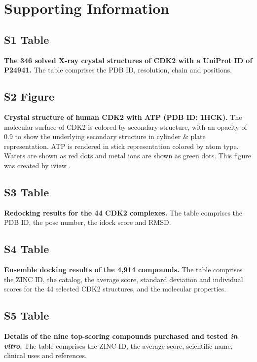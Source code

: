 \documentclass[10pt,letterpaper]{article}
\begin{document}
\section*{Supporting Information}


\subsection*{S1 Table}
\label{S1_Table}
{\bf The 346 solved X-ray crystal structures of CDK2 with a UniProt ID of P24941.} The table comprises the PDB ID, resolution, chain and positions.%

\subsection*{S2 Figure}
\label{S2_Figure}
{\bf Crystal structure of human CDK2 with ATP (PDB ID: 1HCK).} The molecular surface of CDK2 is colored by secondary structure, with an opacity of 0.9 to show the underlying secondary structure in cylinder \& plate representation. ATP is rendered in stick representation colored by atom type. Waters are shown as red dots and metal ions are shown as green dots. This figure was created by iview \cite{1366}.%

\subsection*{S3 Table}
\label{S3_Table}
{\bf Redocking results for the 44 CDK2 complexes.} The table comprises the PDB ID, the pose number, the idock score and RMSD.%

\subsection*{S4 Table}
\label{S4_Table}
{\bf Ensemble docking results of the 4,914 compounds.} The table comprises the ZINC ID, the catalog, the average score, standard deviation and individual scores for the 44 selected CDK2 structures, and the molecular properties.%

\subsection*{S5 Table}
\label{S5_Table}
{\bf Details of the nine top-scoring compounds purchased and tested \textit{in vitro}.} The table comprises the ZINC ID, the average score, scientific name, clinical uses and references.%
\end{document}
